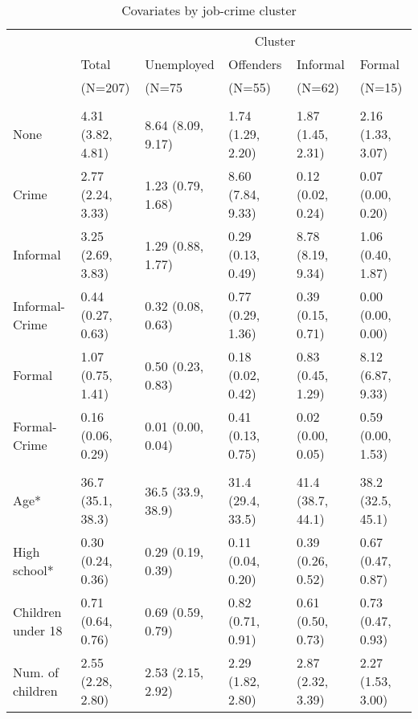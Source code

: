 
\renewcommand{\arraystretch}{0.8}
\begin{scriptsize}
{\setlength{\tabcolsep}{5pt}
\begin{longtable}{llllll} 
\caption{Covariates by job-crime cluster}%
 \label{tab:desc_job_crime_clusters}\\
\hline
\addlinespace
& & \multicolumn{4}{c}{Cluster} \\
\addlinespace
\cmidrule(lr){3-6} 
\addlinespace
& \multicolumn{1}{l}{Total} & \multicolumn{1}{l}{Unemployed} & \multicolumn{1}{l}{Offenders} & \multicolumn{1}{l}{Informal} & \multicolumn{1}{l}{Formal} \\& \multicolumn{1}{l}{(N=207)} & \multicolumn{1}{l}{(N=75} 
        & \multicolumn{1}{l}{(N=55)} & \multicolumn{1}{l}{(N=62)} 
        & \multicolumn{1}{l}{(N=15)} \\\addlinespace[8pt]
\hline
\addlinespace[12pt]
\multicolumn{6}{l}{\textbf{Time spent on job (months)}} \\
\addlinespace\quad None & 4.31 (3.82, 4.81) & 8.64 (8.09, 9.17) & 1.74 (1.29, 2.20) & 1.87 (1.45, 2.31) & 2.16 (1.33, 3.07) \\ 
  \quad Crime & 2.77 (2.24, 3.33) & 1.23 (0.79, 1.68) & 8.60 (7.84, 9.33) & 0.12 (0.02, 0.24) & 0.07 (0.00, 0.20) \\ 
  \quad Informal & 3.25 (2.69, 3.83) & 1.29 (0.88, 1.77) & 0.29 (0.13, 0.49) & 8.78 (8.19, 9.34) & 1.06 (0.40, 1.87) \\ 
  \quad Informal-Crime & 0.44 (0.27, 0.63) & 0.32 (0.08, 0.63) & 0.77 (0.29, 1.36) & 0.39 (0.15, 0.71) & 0.00 (0.00, 0.00) \\ 
  \quad Formal & 1.07 (0.75, 1.41) & 0.50 (0.23, 0.83) & 0.18 (0.02, 0.42) & 0.83 (0.45, 1.29) & 8.12 (6.87, 9.33) \\ 
  \quad Formal-Crime & 0.16 (0.06, 0.29) & 0.01 (0.00, 0.04) & 0.41 (0.13, 0.75) & 0.02 (0.00, 0.05) & 0.59 (0.00, 1.53) \\ 
  \addlinespace[12pt]
\multicolumn{6}{l}{\textbf{Covariates (average)*}} \\
\addlinespace
\quad Age* & 36.7 (35.1, 38.3) & 36.5 (33.9, 38.9) & 31.4 (29.4, 33.5) & 41.4 (38.7, 44.1) & 38.2 (32.5, 45.1) \\ 
  \quad High school* & 0.30 (0.24, 0.36) & 0.29 (0.19, 0.39) & 0.11 (0.04, 0.20) & 0.39 (0.26, 0.52) & 0.67 (0.47, 0.87) \\ 
  \quad Children under 18 & 0.71 (0.64, 0.76) & 0.69 (0.59, 0.79) & 0.82 (0.71, 0.91) & 0.61 (0.50, 0.73) & 0.73 (0.47, 0.93) \\ 
  \quad Num. of children & 2.55 (2.28, 2.80) & 2.53 (2.15, 2.92) & 2.29 (1.82, 2.80) & 2.87 (2.32, 3.39) & 2.27 (1.53, 3.00) \\ 

\end{longtable}}
\end{scriptsize}
